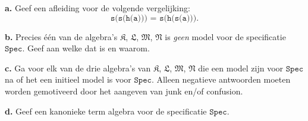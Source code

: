 \documentclass[a4paper,11pt]{article}
\begin{document}
\begin{description}

\item{\bf a.}
Geef een afleiding voor de volgende vergelijking:
\begin{displaymath}
\texttt{s(s(h(a))) = s(h(s(a)))}.
\end{displaymath}

\item{\bf b.}
Precies \'e\'en van de algebra's $\mathfrak{K}$, $\mathfrak{L}$,
$\mathfrak{M}$, $\mathfrak{N}$ is \emph{geen} model voor de specificatie
$\texttt{Spec}$. Geef aan welke dat is en waarom.

\item{\bf c.}
Ga voor elk van de drie algebra's van $\mathfrak{K}$, $\mathfrak{L}$,
$\mathfrak{M}$, $\mathfrak{N}$ die een model zijn voor $\texttt{Spec}$ na of
het een initieel model is voor $\texttt{Spec}$. Alleen negatieve antwoorden
moeten worden gemotiveerd door het aangeven van junk en/of confusion.

\item{\bf d.}
Geef een kanonieke term algebra voor de specificatie $\texttt{Spec}$.

\end{description}
\end{document}
